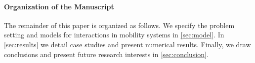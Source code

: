 \paragraph{Organization of the Manuscript}
The remainder of this paper is organized as follows. 
We specify the problem setting and models for interactions in mobility systems in \cref{sec:model}.
In \cref{sec:results} we detail case studies and present numerical results.
Finally, we draw conclusions and present future research interests in \cref{sec:conclusion}.